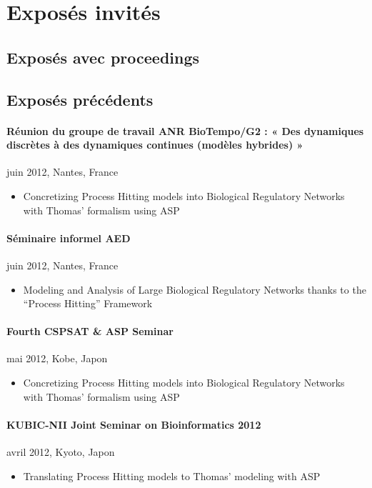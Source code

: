 \section{Exposés invités}

\subsection{Exposés avec proceedings}





\subsection{Exposés précédents}

\paragraph{Réunion du groupe de travail ANR BioTempo/G2 : « Des dynamiques discrètes à des dynamiques continues (modèles hybrides) »}
juin 2012, Nantes, France
\begin{itemize}
\item[] Concretizing Process Hitting models into Biological Regulatory Networks with Thomas' formalism using ASP
\end{itemize}

\paragraph{Séminaire informel AED}
juin 2012, Nantes, France
\begin{itemize}
\item[] Modeling and Analysis of Large Biological Regulatory Networks thanks to the “Process Hitting” Framework
\end{itemize}

\paragraph{Fourth CSPSAT \& ASP Seminar}
mai 2012, Kobe, Japon
\begin{itemize}
\item[] Concretizing Process Hitting models into Biological Regulatory Networks with Thomas' formalism using ASP
\end{itemize}

\paragraph{KUBIC-NII Joint Seminar on Bioinformatics 2012}
avril 2012, Kyoto, Japon
\begin{itemize}
\item[] Translating Process Hitting models to Thomas' modeling with ASP
\end{itemize}

